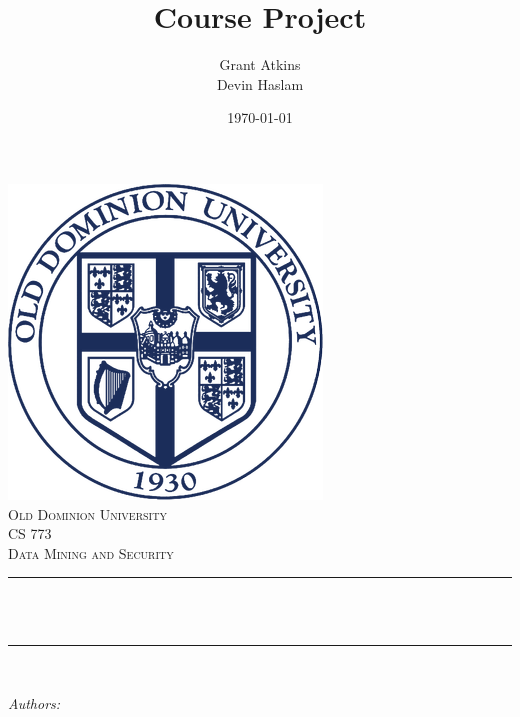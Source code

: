 \documentclass[12pt]{article}
\title{Course Project}										%
\author{Grant Atkins\\Devin Haslam}							%
\date{\today}											%
\makeatletter
\let\thetitle\@title
\let\theauthor\@author
\let\thedate\@date
\makeatother
\begin{document}

\begin{titlepage}
	\centering
    \vspace*{0.5 cm}
    \includegraphics[scale = 1.8]{ODU.png}\\[1.0 cm]	%
    \textsc{\LARGE Old Dominion University}\\[2.0 cm]	%
	\textsc{\Large CS 773}\\[0.5 cm]				%
	\textsc{\large Data Mining and Security}\\[0.5 cm]				%
	\rule{\linewidth}{0.2 mm} \\[0.4 cm]
	{ \huge \bfseries \thetitle}\\
	\rule{\linewidth}{0.2 mm} \\[1.5 cm]
	
	\begin{minipage}{0.4\textwidth}
		\begin{flushleft} \large
			\emph{Authors:}\\
			\theauthor
			\end{flushleft}
			\end{minipage}~
			\begin{minipage}{0.4\textwidth}
			\begin{flushright} \large
		\end{flushright}
	\end{minipage}\\[2 cm]
	
	{\large \thedate}\\[2 cm]
 
	\vfill
	
\end{titlepage}
\end{document}

